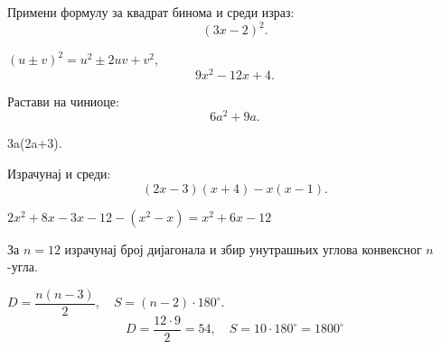 \documentclass[11pt,a5paper,twoside,addpoints,answers]{exam}
\newcommand{\variant}[3]{#1}
\begin{document}
\begin{questions}

\question[3]
Примени формулу за квадрат бинома и среди израз:
\[
\variant{(3x-2)^2}{(2a+5)^2}{(4y-1)^2}.
\]
\begin{solution}[\stretch 2]
$(u\pm v)^2=u^2\pm2uv+v^2$,
\[
\variant{9x^2-12x+4}{4a^2+20a+25}{16y^2-8y+1}.
\]
\end{solution}

\question[3]
Растави на чиниоце:
\[
\variant{6a^2+9a}{9m^2-4}{9x^2-12x+4}.
\]
\begin{solution}[\stretch 2]
\variant{3a(2a+3)}{(3m-2)(3m+2)}{(3x-2)^2}.
\end{solution}

\ifprintanswers\else\newpage\fi

\question[4]
Израчунај и среди:
\[
\variant{
(2x-3)(x+4)-x(x-1)
}{
(3a+2)(a-1)+ (a-4)(a+4)
}{
(5y-1)(y-2)- (2y-3)^2
}.
\]
\begin{solution}[\stretch 3]
\variant{
$2x^2+8x-3x-12-(x^2-x)=x^2+6x-12$
}{
$3a^2-3a+2a-2+(a^2-16)=4a^2-a-18$
}{
$5y^2-10y-y+2-(4y^2-12y+9)=y^2+y-7$.
}
\end{solution}

\question[4]
\variant{
За $n=12$ израчунај број дијагонала и збир унутрашњих углова конвексног $n$-угла.
}{
За $n=15$ израчунај број дијагонала и збир унутрашњих углова конвексног $n$-угла.
}{
Правилан десетоугао: израчунај број дијагонала и меру сваког унутрашњег угла.
}
\begin{solution}[\stretch 3]
$D=\dfrac{n(n-3)}2,\quad S=(n-2)\cdot180^\circ$.
\[
\variant{
D= \frac{12\cdot 9}{2}=54,\quad S=10\cdot180^\circ=1800^\circ
}{
D=\frac{15\cdot12}{2}=90,\quad S=13\cdot180^\circ=2340^\circ
}{
D=\frac{10\cdot7}{2}=35,\;
S=8\cdot180^\circ=1440^\circ,\;
\widehat{\alpha}=\frac{S}{10}=144^\circ.
}
\]
\end{solution}


\end{questions}
\end{document}

